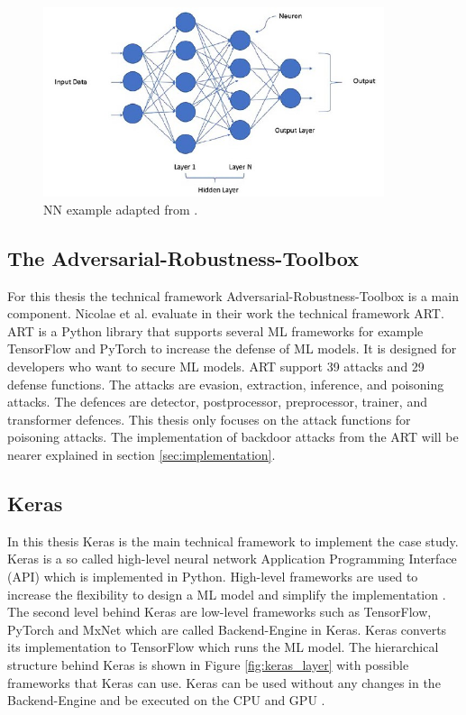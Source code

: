 \begin{figure}[ht!]
  \centering
  \includegraphics[width=10cm]{pictures/neural_network.jpg}
  \caption{NN example adapted from \cite{moolayil_2019}.}
  \label{fig:neural_network}
\end{figure}

\subsection{The Adversarial-Robustness-Toolbox}

For this thesis the technical framework Adversarial-Robustness-Toolbox \cite{art2018} is a main component. Nicolae et al. \cite{DBLP:journals/corr/abs-1807-01069} evaluate in their work
the technical framework ART. ART is a Python library that supports several ML frameworks for example TensorFlow and PyTorch to increase the defense of ML models. It is designed for developers who want to secure ML models. ART support 39 attacks and 29 defense functions. The attacks are evasion, extraction, inference, and poisoning attacks. The defences are detector, postprocessor, preprocessor, trainer, and transformer defences. This thesis only focuses on the attack functions for poisoning attacks. The implementation of backdoor attacks from the ART will be nearer explained in section \ref{sec:implementation}.

\subsection{Keras}

In this thesis Keras \cite{DBLP:journals/corr/abs-2006-12138} is the main technical framework to implement the case study. Keras is a so called high-level neural network Application Programming Interface (API) which is implemented in Python. High-level frameworks are used to increase the flexibility to design a ML model and simplify the implementation \cite{moolayil_2019}. The second level behind Keras are low-level frameworks such as TensorFlow, PyTorch and MxNet which are called Backend-Engine in Keras. Keras converts its implementation to TensorFlow which runs the ML model. The hierarchical structure behind Keras is shown in Figure \ref{fig:keras_layer} with possible frameworks that Keras can use. Keras can be used without any changes in the Backend-Engine and be executed on the CPU and GPU \cite{chollet_francois_2018}.

